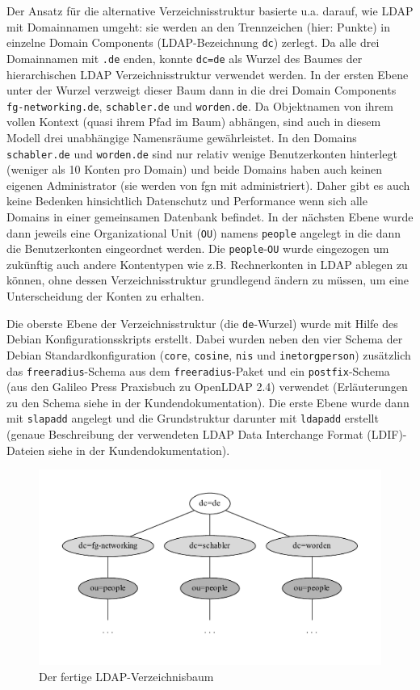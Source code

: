 \documentclass[11pt,a4paper,titlepage=firstiscover,headsepline,bibtotoc]{scrartcl} %
\begin{document}
Der Ansatz für die alternative Verzeichnisstruktur basierte u.a. darauf, wie LDAP mit Domainnamen umgeht: sie werden an den Trennzeichen (hier: Punkte) in einzelne Domain Components (LDAP-Bezeichnung \texttt{dc}) zerlegt. Da alle drei Domainnamen mit \texttt{.de} enden, konnte \texttt{dc=de} als Wurzel des Baumes der hierarchischen LDAP Verzeichnisstruktur verwendet werden. In der ersten Ebene unter der Wurzel verzweigt dieser Baum dann in die drei Domain Components  \texttt{fg-networking.de}, \texttt{schabler.de} und \texttt{worden.de}. Da Objektnamen von ihrem vollen Kontext (quasi ihrem Pfad im Baum) abhängen, sind auch in diesem Modell drei unabhängige Namensräume gewährleistet. In den Domains \texttt{schabler.de} und \texttt{worden.de} sind nur relativ wenige Benutzerkonten hinterlegt (weniger als 10 Konten pro Domain) und beide Domains haben auch keinen eigenen Administrator (sie werden von fgn mit administriert). Daher gibt es auch keine Bedenken hinsichtlich Datenschutz und Performance wenn sich alle Domains in einer gemeinsamen Datenbank befindet. In der nächsten Ebene wurde dann jeweils eine Organizational Unit (\texttt{OU}) namens \texttt{people} angelegt in die dann die Benutzerkonten eingeordnet werden. Die \texttt{people}-\texttt{OU} wurde eingezogen um zukünftig auch andere Kontentypen wie z.B. Rechnerkonten in LDAP ablegen zu können, ohne dessen Verzeichnisstruktur grundlegend ändern zu müssen, um eine Unterscheidung der Konten zu erhalten.

Die oberste Ebene der Verzeichnisstruktur (die \texttt{de}-Wurzel) wurde mit Hilfe des Debian Konfigurationsskripts erstellt. Dabei wurden neben den vier Schema der Debian Standardkonfiguration (\texttt{core}, \texttt{cosine}, \texttt{nis} und \texttt{inetorgperson}) zusätzlich das \texttt{freeradius}-Schema aus dem \texttt{freeradius}-Paket und ein \texttt{postfix}-Schema (aus den Galileo Press Praxisbuch zu OpenLDAP 2.4) verwendet (Erläuterungen zu den Schema siehe  in der Kundendokumentation). Die erste Ebene wurde dann mit \texttt{slapadd} angelegt und die Grundstruktur darunter mit \texttt{ldapadd} erstellt (genaue Beschreibung der verwendeten LDAP Data Interchange Format (LDIF)-Dateien siehe  in der Kundendokumentation).

\begin{figure}[htbp] 
\centering
\includegraphics[width=\textwidth]{Bilder/LDAP-fgn.pdf}
\caption{Der fertige LDAP-Verzeichnisbaum}
\label{fig:LDAP-Baum}
\end{figure}
\end{document}

